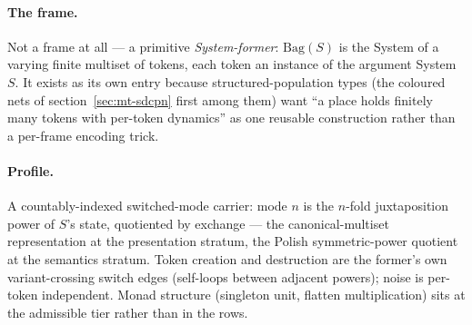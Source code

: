 \paragraph{The frame.} Not a frame at all --- a primitive
\emph{System-former}: $\mathrm{Bag}(S)$ is the System of a varying
finite multiset of tokens, each token an instance of the argument
System $S$. It exists as its own entry because structured-population
types (the coloured nets of section~\ref{sec:mt-sdcpn} first among
them) want ``a place holds finitely many tokens with per-token
dynamics'' as one reusable construction rather than a per-frame
encoding trick.

\paragraph{Profile.} A countably-indexed switched-mode carrier: mode
$n$ is the $n$-fold juxtaposition power of $S$'s state, quotiented by
exchange --- the canonical-multiset representation at the
presentation stratum, the Polish symmetric-power quotient at the
semantics stratum. Token creation and destruction are the former's
own variant-crossing switch edges (self-loops between adjacent
powers); noise is per-token independent. Monad structure (singleton
unit, flatten multiplication) sits at the admissible tier rather than
in the rows.

